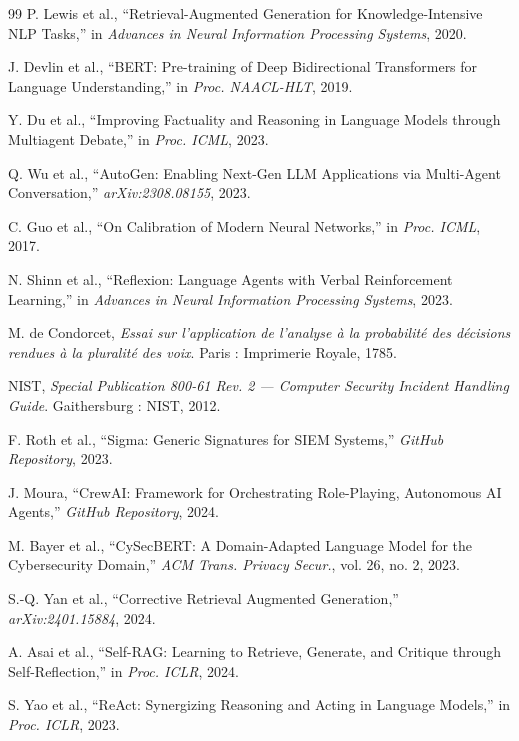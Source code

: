 \documentclass[12pt,a4paper]{report}
\begin{document}
\begin{thebibliography}{99}
P. Lewis et al., ``Retrieval-Augmented Generation for Knowledge-Intensive NLP Tasks,'' in \textit{Advances in Neural Information Processing Systems}, 2020.

J. Devlin et al., ``BERT: Pre-training of Deep Bidirectional Transformers for Language Understanding,'' in \textit{Proc. NAACL-HLT}, 2019.

Y. Du et al., ``Improving Factuality and Reasoning in Language Models through Multiagent Debate,'' in \textit{Proc. ICML}, 2023.

Q. Wu et al., ``AutoGen: Enabling Next-Gen LLM Applications via Multi-Agent Conversation,'' \textit{arXiv:2308.08155}, 2023.

C. Guo et al., ``On Calibration of Modern Neural Networks,'' in \textit{Proc. ICML}, 2017.

N. Shinn et al., ``Reflexion: Language Agents with Verbal Reinforcement Learning,'' in \textit{Advances in Neural Information Processing Systems}, 2023.

M. de Condorcet, \textit{Essai sur l'application de l'analyse à la probabilité des décisions rendues à la pluralité des voix}. Paris : Imprimerie Royale, 1785.

NIST, \textit{Special Publication 800-61 Rev. 2 --- Computer Security Incident Handling Guide}. Gaithersburg : NIST, 2012.

F. Roth et al., ``Sigma: Generic Signatures for SIEM Systems,'' \textit{GitHub Repository}, 2023.

J. Moura, ``CrewAI: Framework for Orchestrating Role-Playing, Autonomous AI Agents,'' \textit{GitHub Repository}, 2024.

M. Bayer et al., ``CySecBERT: A Domain-Adapted Language Model for the Cybersecurity Domain,'' \textit{ACM Trans. Privacy Secur.}, vol. 26, no. 2, 2023.

S.-Q. Yan et al., ``Corrective Retrieval Augmented Generation,'' \textit{arXiv:2401.15884}, 2024.

A. Asai et al., ``Self-RAG: Learning to Retrieve, Generate, and Critique through Self-Reflection,'' in \textit{Proc. ICLR}, 2024.

S. Yao et al., ``ReAct: Synergizing Reasoning and Acting in Language Models,'' in \textit{Proc. ICLR}, 2023.


\end{thebibliography}
\end{document}
